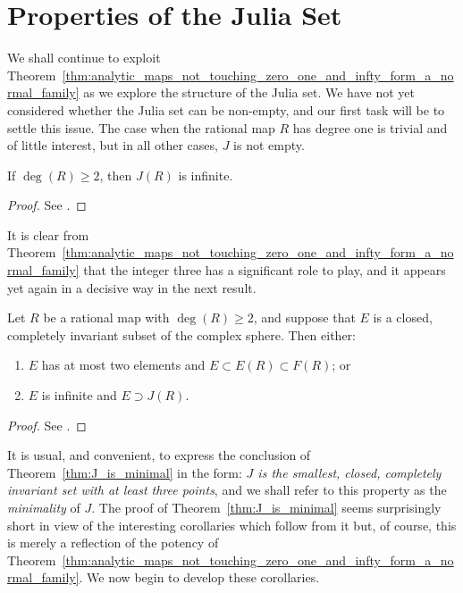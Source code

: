 \section{Properties of the Julia Set}
\label{properties_of_the_Julia_set}

We shall continue to exploit
Theorem~\ref{thm:analytic_maps_not_touching_zero_one_and_infty_form_a_normal_family}
as we explore the structure of the Julia set. We have not yet considered whether
the Julia set can be non-empty, and our first task will be to settle this issue.
The case when the rational map $R$ has degree one is trivial and of little
interest, but in all other cases, $J$ is not empty.

\begin{theorem}[$J$ is infinite]
    \label{thm:J_is_infinite}
    If $\deg(R) \geq 2$, then $J(R)$ is infinite.
\end{theorem}
\begin{proof}
    See \cite[67]{Beardon1991}.
\end{proof}

It is clear from
Theorem~\ref{thm:analytic_maps_not_touching_zero_one_and_infty_form_a_normal_family}
that the integer three has a significant role to play, and it appears yet again
in a decisive way in the next result.

\begin{theorem}[$J$ is minimal]
    \label{thm:J_is_minimal}
    Let $R$ be a rational map with $\deg(R) \geq 2$, and suppose that $E$ is a
    closed, completely invariant subset of the complex sphere. Then either:
    \begin{enumerate}[label=(\roman*)]
        \item $E$ has at most two elements and $E \subset E(R) \subset F(R)$; or
        \item $E$ is infinite and $E \supset J(R)$.
    \end{enumerate}
\end{theorem}
\begin{proof}
    See \cite[68]{Beardon1991}.
\end{proof}

It is usual, and convenient, to express the conclusion of
Theorem~\ref{thm:J_is_minimal} in the form: \emph{$J$ is the smallest, closed,
completely invariant set with at least three points}, and we shall refer to this
property as the \emph{minimality} of $J$. The proof of
Theorem~\ref{thm:J_is_minimal} seems surprisingly short in view of the
interesting corollaries which follow from it but, of course, this is merely a
reflection of the potency of
Theorem~\ref{thm:analytic_maps_not_touching_zero_one_and_infty_form_a_normal_family}.
We now begin to develop these corollaries.

